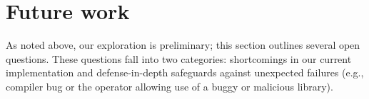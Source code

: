 \section{Future work}
\label{sec:future}

As noted above, our exploration is preliminary; this section outlines several
open questions.  These questions fall into two categories: shortcomings in our
current implementation and defense-in-depth safeguards against unexpected
failures (e.g., compiler bug or the operator allowing use of a buggy or malicious library).

